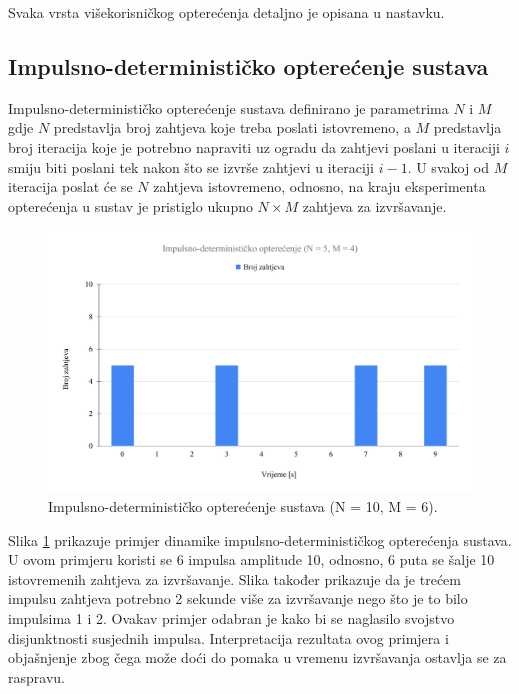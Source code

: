 \documentclass[times, utf8, diplomski]{fer}
\begin{document}
Svaka vrsta višekorisničkog opterećenja detaljno je opisana u nastavku.

\subsection{Impulsno-determinističko opterećenje sustava}
Impulsno-determinističko opterećenje sustava definirano je parametrima $N$ i $M$ gdje $N$ predstavlja broj zahtjeva koje treba poslati istovremeno, a $M$ predstavlja broj iteracija koje je potrebno napraviti uz ogradu da zahtjevi poslani u iteraciji $i$ smiju biti poslani tek nakon što se izvrše zahtjevi u iteraciji $i - 1$. U svakoj od $M$ iteracija poslat će se $N$ zahtjeva istovremeno, odnosno, na kraju eksperimenta opterećenja u sustav je pristiglo ukupno $N \times M$ zahtjeva za izvršavanje.

\begin{figure}[htb]
	\centering
	\includegraphics[width=\textwidth]{images/Impulsno-determinističko opterećenje (N = 5, M = 4).pdf}
	\caption{
		Impulsno-determinističko opterećenje sustava (N = 10, M = 6).
	}
	\label{fig:impulse-load}
\end{figure}

Slika \ref{fig:impulse-load} prikazuje primjer dinamike impulsno-determinističkog opterećenja sustava. U ovom primjeru koristi se 6 impulsa amplitude 10, odnosno, 6 puta se šalje 10 istovremenih zahtjeva za izvršavanje. Slika također prikazuje da je trećem impulsu zahtjeva potrebno 2 sekunde više za izvršavanje nego što je to bilo impulsima 1 i 2. Ovakav primjer odabran je kako bi se naglasilo svojstvo disjunktnosti susjednih impulsa. Interpretacija rezultata ovog primjera i objašnjenje zbog čega može doći do pomaka u vremenu izvršavanja ostavlja se za raspravu.
\end{document}
